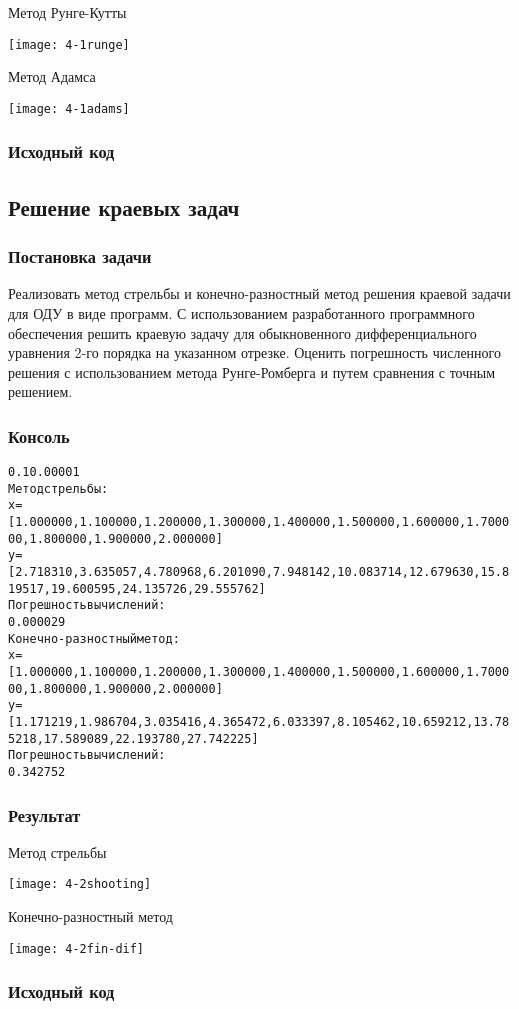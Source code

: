 Метод Рунге-Кутты
\begin{center}
\texttt{[image: 4-1runge]}
\end{center}
\pagebreak

Метод Адамса
\begin{center}
\texttt{[image: 4-1adams]}
\end{center}
\pagebreak

\subsubsection{Исходный код}

\pagebreak

\subsection{Решение краевых задач}

\subsubsection{Постановка задачи}
Реализовать метод стрельбы и конечно-разностный метод решения краевой задачи для ОДУ в виде программ. С использованием разработанного программного обеспечения решить краевую задачу для обыкновенного дифференциального уравнения 2-го порядка на указанном отрезке. Оценить погрешность численного решения с использованием метода Рунге-Ромберга и путем сравнения с точным решением.

\subsubsection{Консоль}
\begin{alltt}
0.1 0.00001
Метод стрельбы:
x = [1.000000, 1.100000, 1.200000, 1.300000, 1.400000, 1.500000, 1.600000, 1.700000, 1.800000, 1.900000, 2.000000]
y = [2.718310, 3.635057, 4.780968, 6.201090, 7.948142, 10.083714, 12.679630, 15.819517, 19.600595, 24.135726, 29.555762]
Погрешность вычислений:
0.000029
Конечно-разностный метод:
x = [1.000000, 1.100000, 1.200000, 1.300000, 1.400000, 1.500000, 1.600000, 1.700000, 1.800000, 1.900000, 2.000000]
y = [1.171219, 1.986704, 3.035416, 4.365472, 6.033397, 8.105462, 10.659212, 13.785218, 17.589089, 22.193780, 27.742225]
Погрешность вычислений:
0.342752
\end{alltt}
\pagebreak

\subsubsection{Результат}
Метод стрельбы
\begin{center}
\texttt{[image: 4-2shooting]}
\end{center}

Конечно-разностный метод
\begin{center}
\texttt{[image: 4-2fin-dif]}
\end{center}
\pagebreak

\subsubsection{Исходный код}

\pagebreak
